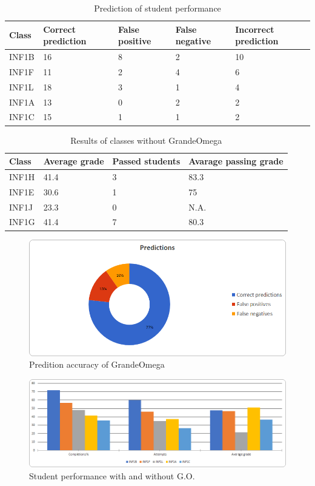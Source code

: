 \begin{table}[!h]
	\begin{tabular}{|p{}|p{}|p{}|p{}|p{}|}
		\hline
		\textbf{Class} & \textbf{Correct prediction} & \textbf{False positive} & \textbf{False negative} & \textbf{Incorrect prediction} \\
		\hline
		INF1B & 16 & 8 & 2 & 10 \\
		\hline
		INF1F & 11 & 2 & 4 & 6 \\
		\hline
		INF1L & 18 & 3 & 1 & 4 \\
		\hline
		INF1A & 13 & 0 & 2 & 2 \\
		\hline
		INF1C & 15 & 1 & 1 & 2 \\
		\hline
	\end{tabular}
	\caption{Prediction of student performance}
	\label{tab:prediction}
\end{table}

\begin{table}[!h]
	\begin{tabular}{|p{}|p{}|p{}|p{}|}
		\hline
		\textbf{Class} & \textbf{Average grade} & \textbf{Passed students} & \textbf{Avarage passing grade} \\
		\hline
		INF1H & 41.4 & 3 & 83.3 \\
		\hline
		INF1E & 30.6 & 1 & 75 \\
		\hline
		INF1J & 23.3 & 0 & N.A. \\
		\hline
		INF1G & 41.4 & 7 & 80.3 \\
		\hline
	\end{tabular}
	\caption{Results of classes without GrandeOmega}
	\label{tab:performance_no_go}
\end{table}

\begin{figure}[!h]
	\includegraphics[width = \textwidth]{Figures/prediction}
	\caption{Predition accuracy of GrandeOmega}
	\label{fig:prediction}
\end{figure}

\begin{figure}[!h]
	\includegraphics[width = \textwidth]{Figures/bar_chart}
	\caption{Student performance with and without G.O.}
	\label{fig:bar_chart}
\end{figure}